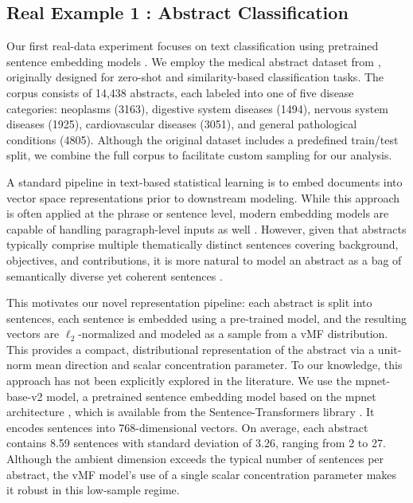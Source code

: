 \documentclass[10pt]{article}
\begin{document}
\subsection{Real Example 1 : Abstract Classification}

Our first real-data experiment focuses on text classification using pretrained sentence embedding models \citep{patil_2023_SurveyTextRepresentation}. We employ the medical abstract dataset from \citet{schopf_2022_EvaluatingUnsupervisedText}, originally designed for zero-shot and similarity-based classification tasks. The corpus consists of 14,438 abstracts, each labeled into one of five disease categories: neoplasms (3163), digestive system diseases (1494), nervous system diseases (1925), cardiovascular diseases (3051), and general pathological conditions (4805). Although the original dataset includes a predefined train/test split, we combine the full corpus to facilitate custom sampling for our analysis.

A standard pipeline in text-based statistical learning is to embed documents into vector space representations prior to downstream modeling. While this approach is often applied at the phrase or sentence level, modern embedding models are capable of handling paragraph-level inputs as well \citep{le_2014_DistributedRepresentationsSentences}. However, given that abstracts typically comprise multiple thematically distinct sentences covering background, objectives, and contributions, it is more natural to model an abstract as a bag of semantically diverse yet coherent sentences \citep{harris_1954_DistributionalStructure}.

This motivates our novel representation pipeline: each abstract is split into sentences, each sentence is embedded using a pre-trained model, and the resulting vectors are $\ell_2$-normalized and modeled as a sample from a vMF  distribution. This provides a compact, distributional representation of the abstract via a unit-norm mean direction and scalar concentration parameter. To our knowledge, this approach has not been explicitly explored in the literature. We use the \textsf{mpnet-base-v2} model, a pretrained sentence embedding model  based on the \textsf{mpnet} architecture \citep{song_2020_MPNetMaskedPermuted}, which is available from the \textsf{Sentence-Transformers} library \citep{reimers_2019_SentenceBERTSentenceEmbeddings}. It encodes sentences into 768-dimensional vectors. On average, each abstract contains 8.59 sentences with standard deviation of 3.26, ranging from 2 to 27. Although the ambient dimension exceeds the typical number of sentences per abstract, the vMF model’s use of a single scalar concentration parameter makes it robust in this low-sample regime.
\end{document}
